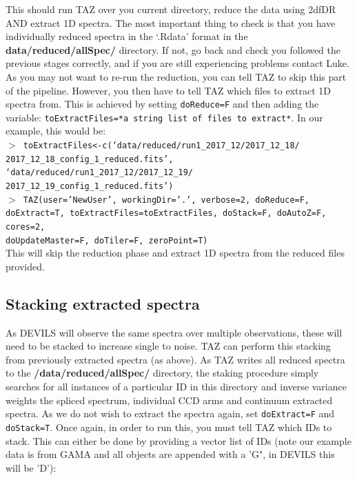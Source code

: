 \documentclass[12pt]{article}
\begin{document}
This should run TAZ over you current directory, reduce the data using 2dfDR AND extract 1D spectra. The most important thing to check is that you have individually reduced spectra in the `.Rdata' format in the \textbf{data/reduced/allSpec/} directory. If not, go back and check you followed the previous stages correctly, and if you are still experiencing problems contact Luke.  \\

As you may not want to re-run the reduction, you can tell TAZ to skip this part of the pipeline. However, you then have to tell TAZ which files to extract 1D spectra from. This is achieved by setting  \texttt{doReduce=F} and then adding the variable: \texttt{toExtractFiles=*a string list of files to extract*}. In our example, this would be:\\

 \hspace{10mm} \texttt{$>$ toExtractFiles<-c(`data/reduced/run1\_2017\_12/2017\_12\_18/ \\ 2017\_12\_18\_config\_1\_reduced.fits', `data/reduced/run1\_2017\_12/2017\_12\_19/ \\ 2017\_12\_19\_config\_1\_reduced.fits')}\\
 
  \hspace{10mm} \texttt{$>$ TAZ(user='NewUser', workingDir='.', verbose=2, doReduce=F, doExtract=T, toExtractFiles=toExtractFiles, doStack=F, doAutoZ=F, cores=2, \\ doUpdateMaster=F, doTiler=F, zeroPoint=T)}\\

 This will skip the reduction phase and extract 1D spectra from the reduced files provided.
 
 \subsection{Stacking extracted spectra}
 
 As DEVILS will observe the same spectra over multiple observations, these will need to be stacked to increase single to noise. TAZ can perform this stacking from previously extracted spectra (as above). As TAZ writes all reduced spectra to the \textbf{/data/reduced/allSpec/} directory, the staking procedure simply searches for all instances of a particular ID in this directory and inverse variance weights the spliced spectrum, individual CCD arms and continuum extracted spectra. As we do not wish to extract the spectra again, set \texttt{doExtract=F} and \texttt{doStack=T}. Once again, in order to run this, you must tell TAZ which IDs to stack. This can either be done by providing a vector list of IDs (note our example data is from GAMA and all objects are appended with a 'G", in DEVILS this will be 'D'):\\
 
\end{document}
